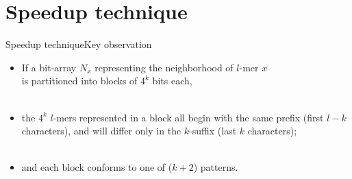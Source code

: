 \documentclass[pdf,xcolor={dvipsnames}]{beamer}
\begin{document}

\section{Speedup technique}
	\begin{frame}{Speedup technique}{Key observation}
		\begin{itemize}
		\item<2-> If a bit-array $N_x$ representing the neighborhood of $l$-mer $x$
		\\ is partitioned into blocks of $4^k$ bits each,\\\ \\
		\end{itemize}
		\begin{itemize}
		\item<4-> the $4^k$ $l$-mers represented in a block all begin with the same { prefix (first $l-k$ characters)}, and will differ only in the { $k$-suffix (last $k$ characters)};\\\ \\
		\item<5-> { and each block conforms to one of ($k + 2$) patterns.}\\\ \\
		\end{itemize}
		\ \\
	\end{frame}
\end{document}
